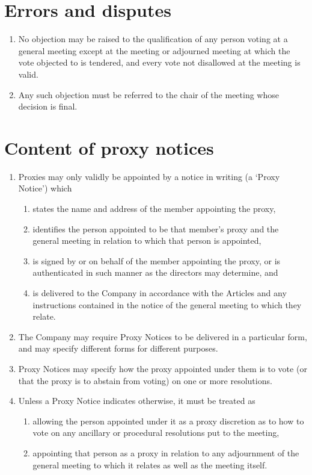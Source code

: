 \documentclass[a4paper,12pt]{article}
\begin{document}
\section{Errors and disputes}

\begin{enumerate}
  \item No objection may be raised to the qualification of any person voting at a general meeting except at the meeting or adjourned meeting at which the vote objected to is tendered, and every vote not disallowed at the meeting is valid.
  \item Any such objection must be referred to the chair of the meeting whose decision is final.
\end{enumerate}

\section{Content of proxy notices}

\begin{enumerate}
  \item Proxies may only validly be appointed by a notice in writing (a `Proxy Notice') which
  \begin{enumerate}
    \item states the name and address of the member appointing the proxy,
    \item identifies the person appointed to be that member’s proxy and the general meeting in relation to which that person is appointed,
    \item is signed by or on behalf of the member appointing the proxy, or is authenticated in such manner as the directors may determine, and
    \item is delivered to the Company in accordance with the Articles and any instructions contained in the notice of the general meeting to which they relate.
  \end{enumerate}
  \item The Company may require Proxy Notices to be delivered in a particular form, and may specify different forms for different purposes.
  \item Proxy Notices may specify how the proxy appointed under them is to vote (or that the proxy is to abstain from voting) on one or more resolutions.
  \item Unless a Proxy Notice indicates otherwise, it must be treated as
  \begin{enumerate}
    \item allowing the person appointed under it as a proxy discretion as to how to vote on any ancillary or procedural resolutions put to the meeting,
    \item appointing that person as a proxy in relation to any adjournment of the general meeting to which it relates as well as the meeting itself.
  \end{enumerate}
\end{enumerate}
\end{document}
